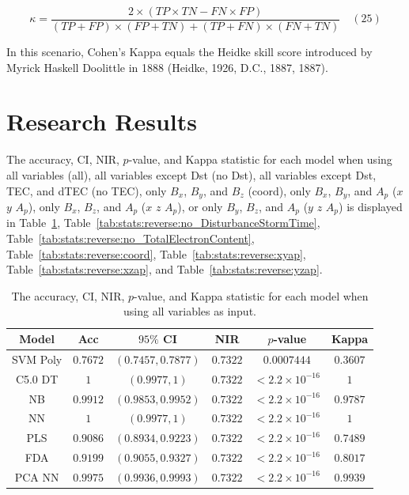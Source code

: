 \documentclass[sn-mathphys-num]{sn-jnl}%
\begin{document}
\begin{equation}
	\kappa ={\frac{2\times (TP\times TN-FN\times FP)}{(TP+FP)\times (FP+TN)+(TP+FN)\times (FN+TN)}}
	\quad\left(25\right)
\end{equation}

In this scenario, Cohen's Kappa equals the Heidke skill score introduced by Myrick Haskell Doolittle in 1888 (Heidke, 1926, D.C., 1887, 1887).

\section{Research Results}
\label{sec:Results}

The accuracy, CI, NIR, $p$-value, and Kappa statistic for each model when using all variables (all), all variables except Dst (no Dst), all variables except Dst, TEC, and dTEC (no TEC), only $B_{x}$, $B_{y}$, and $B_{z}$ (coord), only $B_{x}$, $B_{y}$, and $A_{p}$ ($x$ $y$ $A_{p}$), only $B_{x}$, $B_{z}$, and $A_{p}$ ($x$ $z$ $A_{p}$), or only $B_{y}$, $B_{z}$, and $A_{p}$ ($y$ $z$ $A_{p}$) is displayed in Table~\ref{tab:stats:reverse:all}, Table~\ref{tab:stats:reverse:no_DisturbanceStormTime}, Table~\ref{tab:stats:reverse:no_TotalElectronContent}, Table~\ref{tab:stats:reverse:coord}, Table~\ref{tab:stats:reverse:xyap}, Table~\ref{tab:stats:reverse:xzap}, and Table~\ref{tab:stats:reverse:yzap}.

\begin{table}[!ht]
    \centering
    \caption{The accuracy, CI, NIR, $p$-value, and Kappa statistic for each model when using all variables as input.}
	\label{tab:stats:reverse:all}
	\begin{tabular}{|c|c|c|c|c|c|}
		\hline
		Model & Acc & $95\%$ CI & NIR & $p$-value & Kappa \\ \hline
		SVM Poly & $0.7672$ & $(0.7457, 0.7877)$ & $0.7322$ & $0.0007444$ & $0.3607$ \\ \hline
		C5.0 DT & $1$ & $(0.9977, 1)$ & $0.7322$ & $< 2.2 \times {10}^{-16}$ & $1$ \\ \hline
		NB & $0.9912$ & $(0.9853, 0.9952)$ & $0.7322$ & $< 2.2 \times {10}^{-16}$ & $0.9787$ \\ \hline
		NN & $1$ & $(0.9977, 1)$ & $0.7322$ & $< 2.2 \times {10}^{-16}$ & $1$ \\ \hline
		PLS & $0.9086$ & $(0.8934, 0.9223)$ & $0.7322$ & $< 2.2 \times {10}^{-16}$ & $0.7489$ \\ \hline
		FDA & $0.9199$ & $(0.9055, 0.9327)$ & $0.7322$ & $< 2.2 \times {10}^{-16}$ & $0.8017$ \\ \hline
		PCA NN & $0.9975$ & $(0.9936, 0.9993)$ & $0.7322$ & $< 2.2 \times {10}^{-16}$ & $0.9939$ \\ \hline
	\end{tabular}
\end{table}
\end{document}
